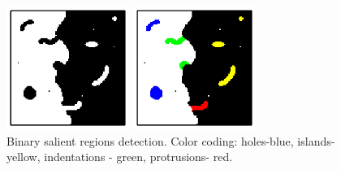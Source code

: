 \documentclass{article}
\begin{document}
\begin{figure}[htb]

\begin{minipage}[b]{.48\linewidth}
  \centering
  \centerline{\includegraphics[width=4.0cm]{./Figs/binary_marks}}
\end{minipage}
\begin{minipage}[b]{0.48\linewidth}
  \centering
  \centerline{\includegraphics[width=4.0cm]{./Figs/binary_marks_clean_color_coded}}
\end{minipage}
\vspace{-0.6cm}
\caption{Binary salient regions detection.
Color coding: holes-blue, islands- yellow,
indentations - green, protrusions- red. }
\label{fig:binary_sal}
%
\end{figure}
\vspace*{-0.25cm}
\end{document}

